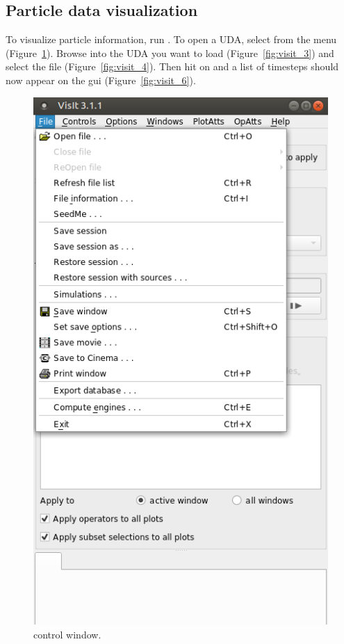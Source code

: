 \begin{paracol}{2}
  \section{Particle data visualization}
  To visualize particle information, run \Visit.  
  To open a UDA, select  from the  menu
  (Figure~\ref{fig:visit_2}). Browse into
  the UDA you want to load (Figure~\ref{fig:visit_3}) and select the 
  file (Figure~\ref{fig:visit_4}). Then hit on  and a list of timesteps should
  now appear on the gui (Figure~\ref{fig:visit_6}). 

  \switchcolumn

  \begin{figure}[htb!]
    \centering
    \includegraphics[width=0.9\columnwidth]{FIGS/visit/visit_2.png}
    \caption{\Visit control window.}
    \label{fig:visit_2}
  \end{figure}


\end{paracol}

